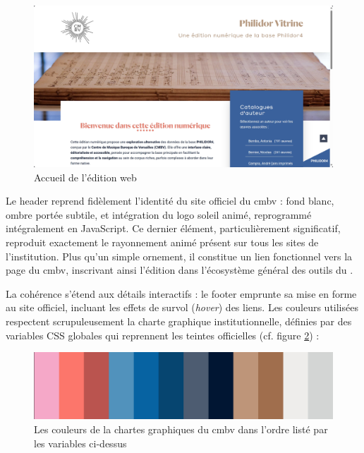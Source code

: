 \begin{figure}[h]
	\caption{Accueil de l'édition web} \label{accueil-edition}
	\centering
	\includegraphics[width=\textwidth]{images/accueil-edition-philidor.png}
\end{figure}

Le header reprend fidèlement l'identité du site officiel du \gls{cmbv} : fond blanc, ombre portée subtile, et intégration du logo soleil animé, reprogrammé intégralement en JavaScript. Ce dernier élément, particulièrement significatif, reproduit exactement le rayonnement animé présent sur tous les sites de l'institution. Plus qu'un simple ornement, il constitue un lien fonctionnel vers la page  du \gls{cmbv}, inscrivant ainsi l'édition dans l'écosystème général des outils du .

La cohérence s'étend aux détails interactifs : le footer emprunte sa mise en forme au site officiel, incluant les effets de survol (\textit{hover}) des liens. Les couleurs utilisées respectent scrupuleusement la charte graphique institutionnelle, définies par des variables CSS globales qui reprennent les teintes officielles (cf. figure \ref{couleurs-cmbv}) :


\begin{figure}[h]
	\caption{Les couleurs de la chartes graphiques du \gls{cmbv} dans l'ordre listé par les variables ci-dessus} \label{couleurs-cmbv}
	\centering
	\includegraphics[width=\textwidth]{images/couleurs-cmbv.jpeg}
\end{figure}

